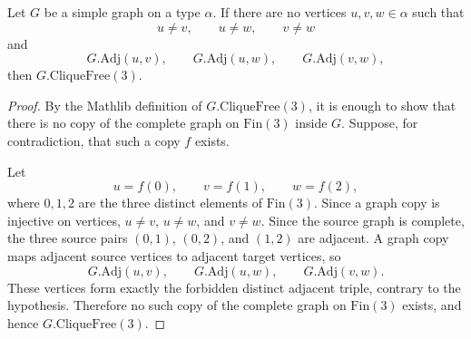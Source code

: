 \begin{helper}
Let \(G\) be a simple graph on a type \(\alpha\).  If there are no vertices
\(u,v,w\in\alpha\) such that
\[
u\ne v,\qquad u\ne w,\qquad v\ne w
\]
and
\[
G.\mathrm{Adj}(u,v),\qquad
G.\mathrm{Adj}(u,w),\qquad
G.\mathrm{Adj}(v,w),
\]
then \(G.\mathrm{CliqueFree}(3)\).
\end{helper}
\begin{proof}
By the Mathlib definition of \(G.\mathrm{CliqueFree}(3)\), it is enough to
show that there is no copy of the complete graph on \(\mathrm{Fin}(3)\) inside
\(G\).  Suppose, for contradiction, that such a copy \(f\) exists.

Let
\[
u=f(0),\qquad v=f(1),\qquad w=f(2),
\]
where \(0,1,2\) are the three distinct elements of \(\mathrm{Fin}(3)\).  Since
a graph copy is injective on vertices, \(u\ne v\), \(u\ne w\), and \(v\ne w\).
Since the source graph is complete, the three source pairs \((0,1)\),
\((0,2)\), and \((1,2)\) are adjacent.  A graph copy maps adjacent source
vertices to adjacent target vertices, so
\[
G.\mathrm{Adj}(u,v),\qquad
G.\mathrm{Adj}(u,w),\qquad
G.\mathrm{Adj}(v,w).
\]
These vertices form exactly the forbidden distinct adjacent triple, contrary
to the hypothesis.  Therefore no such copy of the complete graph on
\(\mathrm{Fin}(3)\) exists, and hence \(G.\mathrm{CliqueFree}(3)\).
\end{proof}
